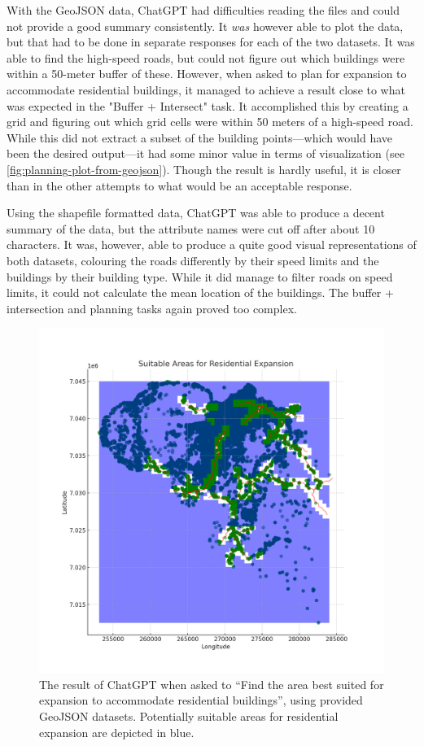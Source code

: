 With the GeoJSON data, ChatGPT had difficulties reading the files and could not provide a good summary consistently. It \textit{was} however able to plot the data, but that had to be done in separate responses for each of the two datasets. It was able to find the high-speed roads, but could not figure out which buildings were within a 50-meter buffer of these. However, when asked to plan for expansion to accommodate residential buildings, it managed to achieve a result close to what was expected in the "Buffer + Intersect" task. It accomplished this by creating a grid and figuring out which grid cells were within 50 meters of a high-speed road. While this did not extract a subset of the building points---which would have been the desired output---it had some minor value in terms of visualization (see \autoref{fig:planning-plot-from-geojson}). Though the result is hardly useful, it is closer than in the other attempts to what would be an acceptable response.

Using the shapefile formatted data, ChatGPT was able to produce a decent summary of the data, but the attribute names were cut off after about 10 characters. It was, however, able to produce a quite good visual representations of both datasets, colouring the roads differently by their speed limits and the buildings by their building type. While it did manage to filter roads on speed limits, it could not calculate the mean location of the buildings. The buffer + intersection and planning tasks again proved too complex.

\begin{figure}
    \centering
    \includegraphics[width=\textwidth]{../figs/residential_expansion_areas_map.png}
    \caption{The result of ChatGPT when asked to \enquote{Find the area best suited for expansion to accommodate residential buildings}, using provided GeoJSON datasets. Potentially suitable areas for residential expansion  are depicted in blue.}
    \label{fig:planning-plot-from-geojson}
\end{figure}

